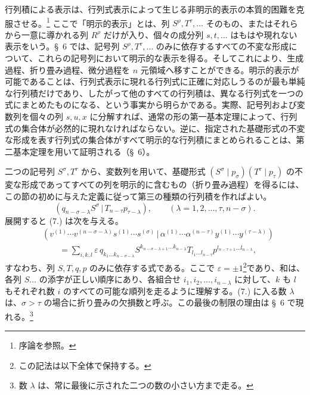 \documentclass[11pt]{article}
\newcommand{\pair}[2]{(#1\,|\,#2)}
\newcommand{\eps}{\varepsilon}
\begin{document}
行列積による表示は、行列式表示によって生じる非明示的表示の本質的困難を克服させる。\footnote{序論を参照。} ここで「明示的表示」とは、列 $S^\rho,T^\tau,\ldots$ そのもの、またはそれらから一意に導かれる列 $R^\rho$ だけが入り、個々の成分列 $s,t,\ldots$ はもはや現れない表示をいう。\S\ 6 では、記号列 $S^\rho,T^\tau,\ldots$ のみに依存するすべての不変な形成について、これらの記号列において明示的な表示を得る。そしてこれにより、生成過程、折り畳み過程、微分過程を $n$ 元領域へ移すことができる。明示的表示が可能であることは、行列式表示に現れる行列式に正確に対応しうるのが最も単純な行列積だけであり、したがって他のすべての行列積は、異なる行列式を一つの式にまとめたものになる、という事実から明らかである。実際、記号列および変数列を個々の列 $s,u,x$ に分解すれば、通常の形の第一基本定理によって、行列式の集合体が必然的に現れなければならない。逆に、指定された基礎形式の不変な形成を表す行列式の集合体がすべて明示的な行列積にまとめられることは、第二基本定理を用いて証明される（\S\ 6）。

二つの記号列 $S^\sigma,T^\tau$ から、変数列を用いて、基礎形式 $(S^\sigma\mid p_\sigma)(T^\tau\mid p_\tau)$ の不変な形成であってすべての列を明示的に含むもの（折り畳み過程）を得るには、この節の初めに与えた定義に従って第三の種類の行列積を作ればよい。
\begin{equation}
 \pair{q_{n-\sigma-\lambda}S^\sigma}{T_{n-\tau}p_{\tau-\lambda}},
 \qquad (\lambda=1,2,\ldots,\tau,n-\sigma).
\tag{7}
\end{equation}
展開すると (7.) は次を与える。
\begin{equation}
\begin{aligned}
&\pair{v^{(1)}\cdots v^{(n-\sigma-\lambda)}s^{(1)}\cdots s^{(\sigma)}}
       {\alpha^{(1)}\cdots\alpha^{(n-\tau)}y^{(1)}\cdots y^{(\tau-\lambda)}} \\
&\qquad =\sum_{i,k,l}\eps\,q_{k_1\ldots k_{n-\sigma-\lambda}}
 S^{k_{n-\sigma-\lambda+1}\ldots k_{n-\lambda}}
 T_{l_1\ldots l_{n-\tau}}
 p^{l_{n-\tau+1}\ldots l_{n-\lambda}},
\end{aligned}
\tag{8}
\end{equation}
すなわち、列 $S,T,q,p$ のみに依存する式である。ここで $\eps=\pm1$\footnote{この記法は以下全体で保持する。}であり、和は、各列 $S\ldots$ の添字が正しい順序にあり、各組合せ $i_1,i_2,\ldots,i_{n-\lambda}$ に対して、$k$ も $l$ もそれぞれ数 $i$ のすべての可能な順列を走るように理解する。(7.) に入る数 $\lambda$ は、$\sigma>\tau$ の場合に折り畳みの欠損数と呼ぶ。この最後の制限の理由は \S\ 6 で現れる。\footnote{数 $\lambda$ は、常に最後に示された二つの数の小さい方まで走る。}
\end{document}
